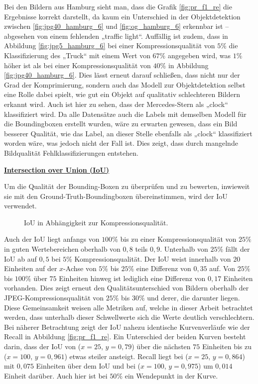             Bei den Bildern aus Hamburg sieht man, dass die Grafik \ref{fig:pr_f1_re} die Ergebnisse korrekt darstellt, da kaum ein Unterschied in der Objektdetektion zwischen \ref{fig:jpg40_hamburg_6} und \ref{fig:og_hamburg_6} erkennbar ist – abgesehen von einem fehlenden „traffic light“. Auffällig ist zudem, dass in Abbildung \ref{fig:jpg5_hamburg_6} bei einer Kompressionsqualität von $5\%$ die Klassifizierung des „Truck“ mit einem Wert von $67\%$ angegeben wird, was $1\%$ höher ist als bei einer Kompressionsqualität von $40\%$ in Abbildung \ref{fig:jpg40_hamburg_6}.
            Dies lässt erneut darauf schließen, dass nicht nur der Grad der Komprimierung, sondern auch das Modell zur Objektdetektion selbst eine Rolle dabei spielt, wie gut ein Objekt auf qualitativ schlechteren Bildern erkannt wird.
            Auch ist hier zu sehen, dass der Mercedes-Stern als „clock“ klassifiziert wird. Da alle Datensätze auch die Labels mit demselben Modell für die Boundingboxen erstellt wurden, wäre zu erwarten gewesen, dass ein Bild besserer Qualität, wie das Label, an dieser Stelle ebenfalls als „clock“ klassifiziert worden wäre, was jedoch nicht der Fall ist. 
            Dies zeigt, dass durch mangelnde Bildqualität Fehlklassifizierungen entstehen.
            
\newpage  
            \underline{\textbf{Intersection over Union (IoU)}}\bigskip
            
            Um die Qualität der Bounding-Boxen zu überprüfen und zu bewerten, inwieweit sie mit den Ground-Truth-Boundingboxen übereinstimmen, wird der IoU verwendet.
            
            \begin{figure}[!htb]
                \centering
                
                \caption{IoU in Abhängigkeit zur Kompressionsqualität.}
                \label{fig:iou}
            \end{figure}
            Auch der IoU liegt anfangs von $100\%$ bis zu einer Kompressionsqualität von $25\%$ in guten Wertebereichen oberhalb von $0,8$ teils $0,9$. Unterhalb von $25\%$ fällt der IoU ab auf $0,5$ bei $5\%$ Kompressionsqualität. Der IoU weist innerhalb von $20$ Einheiten auf der $x$-Achse von $5\%$ bis $25\%$ eine Differenz von $0,35$ auf. Von $25\%$ bis $100\%$ über $75$ Einheiten hinweg ist lediglich eine Differenz von $0,17$ Einheiten vorhanden. Dies zeigt erneut den Qualitätsunterschied von Bildern oberhalb der JPEG-Kompressionsqualität von $25\%$ bis $30\%$ und derer, die darunter liegen. Diese Gemeinsamkeit weisen alle Metriken auf, welche in dieser Arbeit betrachtet werden, dass unterhalb dieser Schwellwerte sich die Werte deutlich verschlechtern.
            Bei näherer Betrachtung zeigt der IoU nahezu identische Kurvenverläufe wie der Recall in Abbildung \ref{fig:pr_f1_re}. Ein Unterschied der beiden Kurven besteht darin, dass der IoU von ($x = 25$, $y = 0,79$) über die nächsten $75$ Einheiten bis zu ($x = 100$, $y = 0,961$) etwas steiler ansteigt. Recall liegt bei ($x = 25$, $y = 0,864$) mit $0,075$ Einheiten über dem IoU und bei ($x = 100$, $y = 0,975$) um $0,014$ Einheit darüber. Auch hier ist bei $50\%$ ein Wendepunkt in der Kurve.
            

